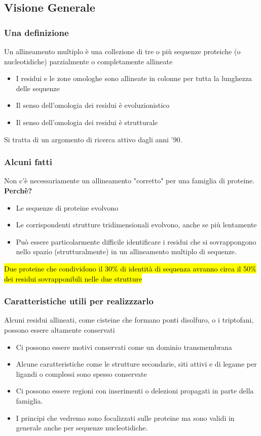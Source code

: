 \documentclass{article}
\begin{document}
\subsection{Visione Generale}
\subsubsection{Una definizione}
Un allineamento multiplo è una collezione di tre o più sequenze proteiche (o nucleotidiche) parzialmente o completamente allineate
\begin{itemize}
    \item I residui e le zone omologhe sono allineate in colonne per tutta la lunghezza delle sequenze
    \item Il senso dell'omologia dei residui è evoluzionistico
    \item Il senso dell'omologia dei residui è strutturale
\end{itemize}
Si tratta di un argomento di ricerca attivo dagli anni '90.
\subsubsection{Alcuni fatti}
Non c'è necessariamente un allineamento "corretto" per una famiglia di proteine.\\
\textbf{Perchè?}
    \begin{itemize}
        \item Le sequenze di proteine evolvono
        \item Le corrispondenti strutture tridimensionali evolvono, anche se più lentamente
        \item Può essere particolarmente difficile identificare i residui che si sovrappongono nello spazio (strutturalmente) in un allineamento multiplo di sequenze.
    \end{itemize}
\hl{Due proteine che condividono il 30\% di identità di sequenza avranno circa il 50\% dei residui sovrapponibili nelle due strutture}
\subsubsection{Caratteristiche utili per realizzzarlo}
Alcuni residui allineati, come cisteine che formano ponti disolfuro, o i triptofani, possono essere altamente conservati
    \begin{itemize}
        \item Ci possono essere motivi conservati come un dominio transmembrana
        \item Alcune caratteristiche come le strutture secondarie, siti attivi e di legame per ligandi o complessi sono spesso conservate
        \item Ci possono essere regioni con inserimenti o delezioni propagati in parte della famiglia.
        \item I principi che vedremo sono focalizzati sulle proteine ma sono validi in generale anche per sequenze nucleotidiche.
    \end{itemize}
\end{document}
